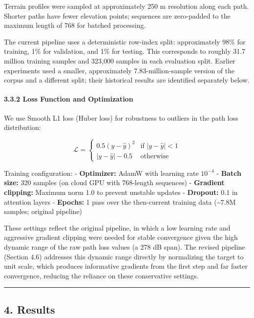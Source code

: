 \documentclass[
]{article}
\begin{document}
Terrain profiles were sampled at approximately 250 m resolution along
each path. Shorter paths have fewer elevation points; sequences are
zero-padded to the maximum length of 768 for batched processing.

The current pipeline uses a deterministic row-index split: approximately
98\% for training, 1\% for validation, and 1\% for testing. This
corresponds to roughly 31.7 million training samples and 323,000 samples
in each evaluation split. Earlier experiments used a smaller,
approximately 7.83-million-sample version of the corpus and a different
split; their historical results are identified separately below.

\paragraph{3.3.2 Loss Function and
Optimization}\label{loss-function-and-optimization}

We use Smooth L1 loss (Huber loss) for robustness to outliers in the
path loss distribution:

\[\mathcal{L} = \begin{cases}
0.5(y - \hat{y})^2 & \text{if } |y - \hat{y}| < 1 \\
|y - \hat{y}| - 0.5 & \text{otherwise}
\end{cases}\]

Training configuration: - \textbf{Optimizer:} AdamW with learning rate
\(10^{-4}\) - \textbf{Batch size:} 320 samples (on cloud GPU with
768-length sequences) - \textbf{Gradient clipping:} Maximum norm 1.0 to
prevent unstable updates - \textbf{Dropout:} 0.1 in attention layers -
\textbf{Epochs:} 1 pass over the then-current training data
(\textasciitilde7.8M samples; original pipeline)

These settings reflect the original pipeline, in which a low learning
rate and aggressive gradient clipping were needed for stable convergence
given the high dynamic range of the raw path loss values (a 278 dB
span). The revised pipeline (Section 4.6) addresses this dynamic range
directly by normalizing the target to unit scale, which produces
informative gradients from the first step and far faster convergence,
reducing the reliance on these conservative settings.

\begin{center}\rule{0.5\linewidth}{0.5pt}\end{center}

\subsection{4. Results}\label{results}
\end{document}
